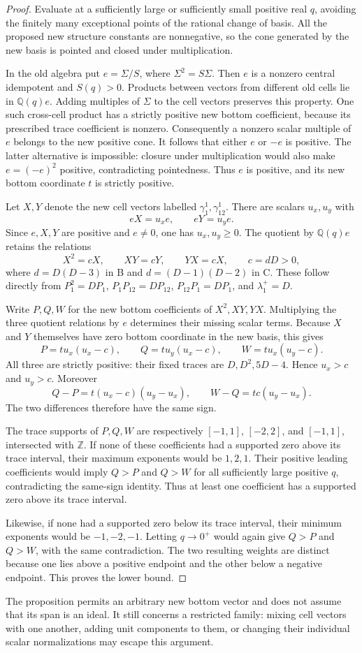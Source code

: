 \begin{proof}
Evaluate at a sufficiently large or sufficiently small positive real $q$, avoiding the finitely many exceptional points of the rational change of basis. All the proposed new structure constants are nonnegative, so the cone generated by the new basis is pointed and closed under multiplication.

In the old algebra put $e=\Sigma/S$, where $\Sigma^2=S\Sigma$. Then $e$ is a nonzero central idempotent and $S(q)>0$. Products between vectors from different old cells lie in $\mathbb Q(q)e$. Adding multiples of $\Sigma$ to the cell vectors preserves this property. One such cross-cell product has a strictly positive new bottom coefficient, because its prescribed trace coefficient is nonzero. Consequently a nonzero scalar multiple of $e$ belongs to the new positive cone. It follows that either $e$ or $-e$ is positive. The latter alternative is impossible: closure under multiplication would also make $e=(-e)^2$ positive, contradicting pointedness. Thus $e$ is positive, and its new bottom coordinate $t$ is strictly positive.

Let $X,Y$ denote the new cell vectors labelled $\gamma_1^1,\gamma_{12}^1$. There are scalars $u_x,u_y$ with
\[
 eX=u_xe,\qquad eY=u_ye.
\]
Since $e,X,Y$ are positive and $e\ne0$, one has $u_x,u_y\ge0$. The quotient by $\mathbb Q(q)e$ retains the relations
\[
 X^2=cX,\qquad XY=cY,\qquad YX=cX,
 \qquad c=dD>0,
\]
where $d=D(D-3)$ in B and $d=(D-1)(D-2)$ in C. These follow directly from $P_1^2=DP_1$, $P_1P_{12}=DP_{12}$, $P_{12}P_1=DP_1$, and $\lambda_1^+=D$.

Write $P,Q,W$ for the new bottom coefficients of $X^2,XY,YX$. Multiplying the three quotient relations by $e$ determines their missing scalar terms. Because $X$ and $Y$ themselves have zero bottom coordinate in the new basis, this gives
\[
 P=t u_x(u_x-c),\qquad
 Q=t u_y(u_x-c),\qquad
 W=t u_x(u_y-c).
\]
All three are strictly positive: their fixed traces are $D,D^2,5D-4$. Hence $u_x>c$ and $u_y>c$. Moreover
\[
 Q-P=t(u_x-c)(u_y-u_x),\qquad
 W-Q=tc(u_y-u_x).
\]
The two differences therefore have the same sign.

The trace supports of $P,Q,W$ are respectively $[-1,1]$, $[-2,2]$, and $[-1,1]$, intersected with $\mathbb Z$. If none of these coefficients had a supported zero above its trace interval, their maximum exponents would be $1,2,1$. Their positive leading coefficients would imply $Q>P$ and $Q>W$ for all sufficiently large positive $q$, contradicting the same-sign identity. Thus at least one coefficient has a supported zero above its trace interval.

Likewise, if none had a supported zero below its trace interval, their minimum exponents would be $-1,-2,-1$. Letting $q\to0^+$ would again give $Q>P$ and $Q>W$, with the same contradiction. The two resulting weights are distinct because one lies above a positive endpoint and the other below a negative endpoint. This proves the lower bound.
\end{proof}

The proposition permits an arbitrary new bottom vector and does not assume that its span is an ideal. It still concerns a restricted family: mixing cell vectors with one another, adding unit components to them, or changing their individual scalar normalizations may escape this argument.
